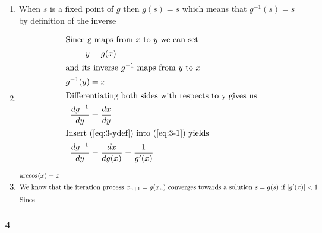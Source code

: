 \documentclass[a4paper]{article}
\newcommand{\ex}[1]{\subsubsection*{#1}}
\begin{document}
\begin{enumerate}[label=\alph*)]
    \item When \(s\) is a fixed point of \(g\) then \(g(s) = s\) which means that
                    \(g^{-1}(s) = s\) by definition of the inverse
    \item 
        \begin{align}
            \intertext{Since g maps from \(x\) to \(y\) we can set}
            y &= g(x)  \label{eq:3-ydef}\\
            \intertext{and its inverse \(g^{-1}\) maps from \(y\) to \(x\)}
            g^{-1}(y) &= x \\
            \intertext{Differentiating both sides with respects to y gives us}
            \frac{dg^{-1}}{dy} &= \frac{dx}{dy} \label{eq:3-1}\\
            \intertext{Insert (\ref{eq:3-ydef}) into (\ref{eq:3-1}) yields}
            \frac{dg^{-1}}{dy} &= \frac{dx}{dg(x)} = \frac{1}{g'(x)} \\
        \end{align}

    \item
        \begin{align}
            \arccos(x) &= x \\
            \intertext{We know that the iteration process \(x_{n+1} = g(x_n)\)
                converges towards a solution \(s = g(s)\) if \(|g'(x)| < 1\)}
            \intertext{Since }
        \end{align}
\end{enumerate}


\ex{4}

\begin{align}
\end{align}


%
\end{document}
